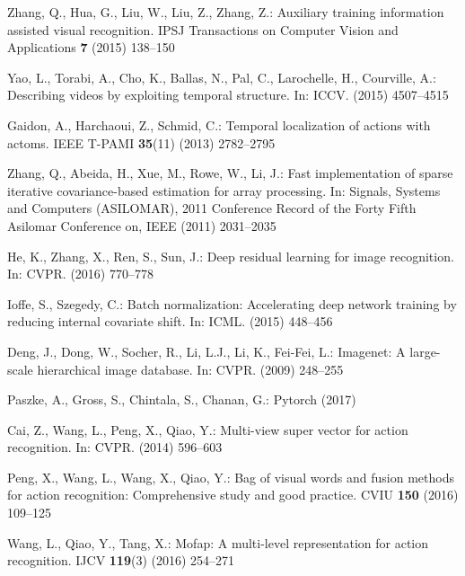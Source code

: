 \documentclass[runningheads,a4paper]{llncs}
\begin{document}
\begin{thebibliography}{10}
	Zhang, Q., Hua, G., Liu, W., Liu, Z., Zhang, Z.:
	\newblock Auxiliary training information assisted visual recognition.
	\newblock IPSJ Transactions on Computer Vision and Applications \textbf{7}
	(2015)  138--150

	Yao, L., Torabi, A., Cho, K., Ballas, N., Pal, C., Larochelle, H., Courville,
	A.:
	\newblock Describing videos by exploiting temporal structure.
	\newblock In: ICCV. (2015)  4507--4515

	Gaidon, A., Harchaoui, Z., Schmid, C.:
	\newblock Temporal localization of actions with actoms.
	\newblock IEEE T-PAMI \textbf{35}(11) (2013)  2782--2795

	Zhang, Q., Abeida, H., Xue, M., Rowe, W., Li, J.:
	\newblock Fast implementation of sparse iterative covariance-based estimation
	for array processing.
	\newblock In: Signals, Systems and Computers (ASILOMAR), 2011 Conference Record
	of the Forty Fifth Asilomar Conference on, IEEE (2011)  2031--2035

	He, K., Zhang, X., Ren, S., Sun, J.:
	\newblock Deep residual learning for image recognition.
	\newblock In: CVPR. (2016)  770--778

	Ioffe, S., Szegedy, C.:
	\newblock Batch normalization: Accelerating deep network training by reducing
	internal covariate shift.
	\newblock In: ICML. (2015)  448--456

	Deng, J., Dong, W., Socher, R., Li, L.J., Li, K., Fei-Fei, L.:
	\newblock Imagenet: A large-scale hierarchical image database.
	\newblock In: CVPR. (2009)  248--255

	Paszke, A., Gross, S., Chintala, S., Chanan, G.:
	\newblock Pytorch (2017)

	Cai, Z., Wang, L., Peng, X., Qiao, Y.:
	\newblock Multi-view super vector for action recognition.
	\newblock In: CVPR. (2014)  596--603

	Peng, X., Wang, L., Wang, X., Qiao, Y.:
	\newblock Bag of visual words and fusion methods for action recognition:
	Comprehensive study and good practice.
	\newblock CVIU \textbf{150} (2016)  109--125

	Wang, L., Qiao, Y., Tang, X.:
	\newblock Mofap: A multi-level representation for action recognition.
	\newblock IJCV \textbf{119}(3) (2016)  254--271


\end{thebibliography}
\end{document}

